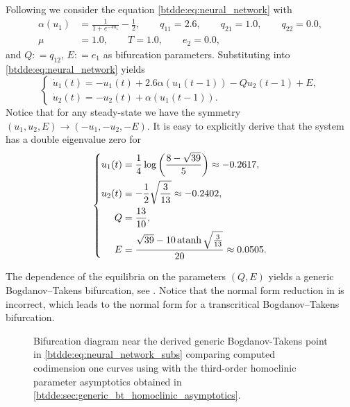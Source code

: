 Following \cite{giannakopoulos2001bifurcations} we consider the equation \cref{btdde:eq:neural_network} with
\begin{align*}
\alpha(u_1) & = \frac{1}{1 + e^{-4u_1}}-\frac{1}{2},\qquad q_{11} = 2.6,\qquad q_{21} = 1.0,\qquad q_{22} = 0.0,\\
\mu & = 1.0,\qquad T = 1.0,\qquad e_2 = 0.0,
\end{align*}
and $Q: = q_{12},\,E: = e_1$ as bifurcation parameters. Substituting
into \cref{btdde:eq:neural_network} yields
\begin{equation}
\label{btdde:eq:neural_network_subs}
\begin{cases}
\dot{u}_1(t) = -u_1(t) + 2.6\alpha(u_1(t - 1))-Qu_2(t - 1) + E,\\
\dot{u}_2(t) = -u_2(t) + \alpha(u_1(t - 1)).
\end{cases}
\end{equation}
Notice that for any steady-state we have the symmetry
$(u_1,u_2,E)\rightarrow(-u_1,-u_2,-E)$. It is easy to explicitly derive that the system has a double eigenvalue zero for
\begin{equation}
    \left\{
    \begin{aligned}
        u_1(t) &= \frac14 \log\left(\frac{8 - \sqrt{39}}5\right) \approx -0.2617, \\
        u_2(t) &= -\frac12 \sqrt{\frac{3}{13}} \approx -0.2402, \\
        Q &= \frac{13}{10}, \\
        E &= \frac{\sqrt{39} - 10\operatorname{atanh} \sqrt{\frac{3}{13}}}{20} \approx 0.0505.
    \end{aligned}\right.
\end{equation}

The dependence of the equilibria on the parameters $(Q,E)$ yields a generic
Bogdanov--Takens bifurcation, see \cite{giannakopoulos2001bifurcations}. Notice
that the normal form reduction in \cite{giannakopoulos2001bifurcations} is
incorrect, which leads to the normal form for a transcritical Bogdanov--Takens
bifurcation.

\begin{figure}[ht!]
    \centering
    \caption{Bifurcation diagram near the derived generic Bogdanov-Takens point in
        \cref{btdde:eq:neural_network_subs} comparing computed codimension one curves using
        \DDEBIFTOOL with the third-order homoclinic parameter asymptotics obtained
        in \cref{btdde:sec:generic_bt_homoclinic_asymptotics}.}
    \label{btdde:fig:NeuralNetworkCompareParameters}
\end{figure}

